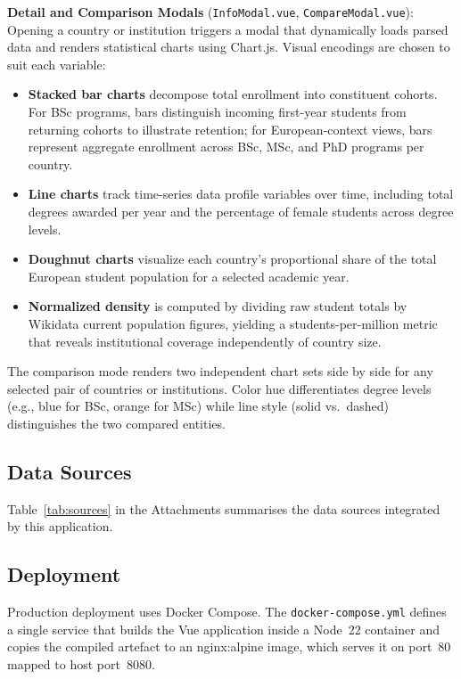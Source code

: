 \documentclass[final,3p,times,twocolumn]{elsarticle}
\begin{document}
\textbf{Detail and Comparison Modals} (\texttt{InfoModal.vue}, \texttt{CompareModal.vue}): Opening a country or institution triggers a modal that dynamically loads parsed data and renders statistical charts using Chart.js. Visual encodings are chosen to suit each variable:
\begin{itemize}
    \item \textbf{Stacked bar charts} decompose total enrollment into constituent cohorts. For BSc programs, bars distinguish incoming first-year students from returning cohorts to illustrate retention; for European-context views, bars represent aggregate enrollment across BSc, MSc, and PhD programs per country.
    \item \textbf{Line charts} track time-series data profile variables over time, including total degrees awarded per year and the percentage of female students across degree levels.
    \item \textbf{Doughnut charts} visualize each country's proportional share of the total European student population for a selected academic year.
    \item \textbf{Normalized density} is computed by dividing raw student totals by Wikidata current population figures, yielding a students-per-million metric that reveals institutional coverage independently of country size.
\end{itemize}
The comparison mode renders two independent chart sets side by side for any selected pair of countries or institutions. Color hue differentiates degree levels (e.g., blue for BSc, orange for MSc) while line style (solid vs.\ dashed) distinguishes the two compared entities.

\subsection{Data Sources}

Table~\ref{tab:sources} in the Attachments summarises the data sources integrated by this application.

\subsection{Deployment}

Production deployment uses Docker Compose. The \texttt{docker-compose.yml} defines a single service that builds the Vue application inside a Node~22 container and copies the compiled artefact to an nginx:alpine image, which serves it on port~80 mapped to host port~8080.
\end{document}
